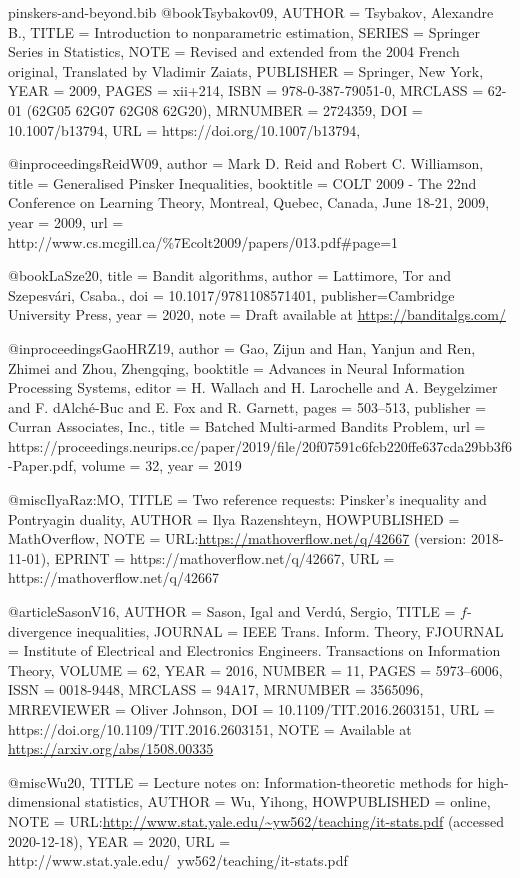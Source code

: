\documentclass[10pt]{article}
\begin{document}
\begin{filecontents}{pinskers-and-beyond.bib}
@book{Tsybakov09,
    AUTHOR = {Tsybakov, Alexandre B.},
     TITLE = {Introduction to nonparametric estimation},
    SERIES = {Springer Series in Statistics},
      NOTE = {Revised and extended from the 2004 French original,
              Translated by Vladimir Zaiats},
 PUBLISHER = {Springer, New York},
      YEAR = {2009},
     PAGES = {xii+214},
      ISBN = {978-0-387-79051-0},
   MRCLASS = {62-01 (62G05 62G07 62G08 62G20)},
  MRNUMBER = {2724359},
       DOI = {10.1007/b13794},
       URL = {https://doi.org/10.1007/b13794},
}

@inproceedings{ReidW09,
  author    = {Mark D. Reid and
               Robert C. Williamson},
  title     = {Generalised Pinsker Inequalities},
  booktitle = {{COLT} 2009 - The 22nd Conference on Learning Theory, Montreal, Quebec,
               Canada, June 18-21, 2009},
  year      = {2009},
  url       = {http://www.cs.mcgill.ca/\%7Ecolt2009/papers/013.pdf\#page=1}
}

@book{LaSze20,
  title     = {Bandit algorithms},
  author    = {Lattimore, Tor and Szepesv{\'a}ri, {\relax Csaba}.},
  doi		= {10.1017/9781108571401}, 
  publisher={Cambridge University Press},
  year = {2020},
  note = {Draft available at \url{https://banditalgs.com/}}
}

@inproceedings{GaoHRZ19,
 author = {Gao, Zijun and Han, Yanjun and Ren, Zhimei and Zhou, Zhengqing},
 booktitle = {Advances in Neural Information Processing Systems},
 editor = {H. Wallach and H. Larochelle and A. Beygelzimer and F. d\textquotesingle Alch\'{e}-Buc and E. Fox and R. Garnett},
 pages = {503--513},
 publisher = {Curran Associates, Inc.},
 title = {Batched Multi-armed Bandits Problem},
 url = {https://proceedings.neurips.cc/paper/2019/file/20f07591c6fcb220ffe637cda29bb3f6-Paper.pdf},
 volume = {32},
 year = {2019}
}

@misc{IlyaRaz:MO,
    TITLE = {{Two reference requests: Pinsker's inequality and Pontryagin duality}},
    AUTHOR = {Ilya Razenshteyn},
    HOWPUBLISHED = {MathOverflow},
    NOTE = {URL:\url{https://mathoverflow.net/q/42667} (version: 2018-11-01)},
    EPRINT = {https://mathoverflow.net/q/42667},
    URL = {https://mathoverflow.net/q/42667}
}

@article{SasonV16,
    AUTHOR = {Sason, Igal and Verd\'{u}, Sergio},
     TITLE = {{$f$}-divergence inequalities},
   JOURNAL = {IEEE Trans. Inform. Theory},
  FJOURNAL = {Institute of Electrical and Electronics Engineers.
              Transactions on Information Theory},
    VOLUME = {62},
      YEAR = {2016},
    NUMBER = {11},
     PAGES = {5973--6006},
      ISSN = {0018-9448},
   MRCLASS = {94A17},
  MRNUMBER = {3565096},
MRREVIEWER = {Oliver Johnson},
       DOI = {10.1109/TIT.2016.2603151},
       URL = {https://doi.org/10.1109/TIT.2016.2603151},
      NOTE = {Available at \url{https://arxiv.org/abs/1508.00335}}
}

@misc{Wu20,
  TITLE = {Lecture notes on: Information-theoretic methods for high-dimensional statistics},
  AUTHOR = {Wu, Yihong},
  HOWPUBLISHED = {online},
  NOTE = {URL:\url{http://www.stat.yale.edu/~yw562/teaching/it-stats.pdf} (accessed 2020-12-18)},
  YEAR = {2020},
  URL = {http://www.stat.yale.edu/~yw562/teaching/it-stats.pdf}
}
\end{filecontents}
\printbibliography
\end{document}
